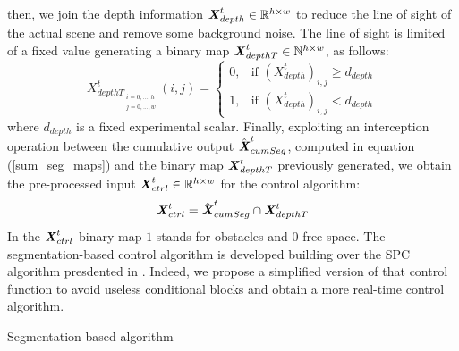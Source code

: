 \documentclass[journal]{IEEEtran}
\begin{document}
then, we join the depth information $\textbf{\textit{X}}_{depth}^{t} \in  \mathbb{R}^{h\times w}$ to reduce the line of sight of the actual scene and remove some background noise.
The line of sight is limited of a fixed value generating a binary map $\textbf{\textit{X}}_{depthT}^{t} \in  \mathbb{N}^{h\times w}$, as follows:
\begin{equation}
\label{depth}
    {\textit{X}_{depthT_{\substack{i=0,...,h\\j=0,...,w}}}^{t}}(i,j)
    =\begin{cases} 0, & \mbox{if }(\textit{X}_{depth}^{t})_{i,j}\geq d_{depth} \\ 1, & \mbox{if }(\textit{X}_{depth}^{t})_{i,j}<d_{depth}
\end{cases}
\end{equation}
where $d_{depth}$ is a fixed experimental scalar.
Finally, exploiting an interception operation between the cumulative output $\hat{\textbf{\textit{X}}}_{cumSeg}^{t}$, computed in equation (\ref{sum_seg_maps}) and the binary map $\textbf{\textit{X}}_{depthT}^{t}$ previously generated, we obtain the pre-processed input  $\textbf{\textit{X}}_{ctrl}^{t}\in  \mathbb{R}^{h\times w}$ for the control algorithm:
\begin{equation}
    \textbf{\textit{X}}_{ctrl}^{t} = \hat{\textbf{\textit{X}}}_{cumSeg}^{t} \cap \textbf{\textit{X}}_{depthT}^{t}
\end{equation}
In the $\textbf{\textit{X}}_{ctrl}^{t}$ binary map $1$ stands for obstacles and $0$ free-space.
The segmentation-based control algorithm is developed building over the SPC algorithm presdented in \cite{aghi2021deep}. Indeed, we propose a simplified version of that control function to avoid useless conditional blocks and obtain a more real-time control algorithm.
\begin{algorithm}[t]
	\caption{Segmentation-based algorithm}
	\label{alg_seg_algorithm}
	\begin{algorithmic}[1]
		\ENDFOR
		\ELSE
		\ENDIF
	\end{algorithmic}
\end{algorithm}
\end{document}
